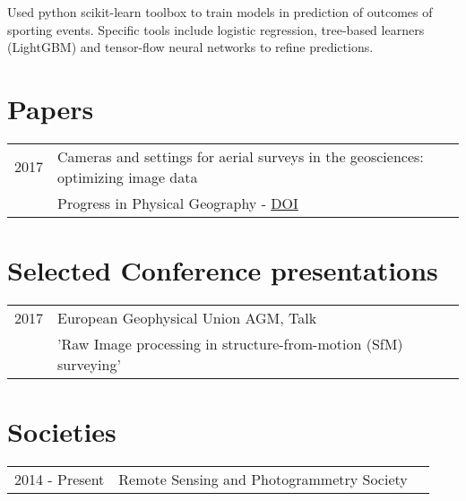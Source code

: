 \documentclass[]{JOC_CV}
\begin{document}
\begin{minipage}[t]{0.66\textwidth}
\linebreak
{}
Used python scikit-learn toolbox to train models in prediction of outcomes of sporting events.
Specific tools include logistic regression, tree-based learners (LightGBM) and tensor-flow neural
networks to refine predictions.
\sectionsep


\section{Papers}\label{sec:papers}

\begin{tabular}{rll}
2017	& Cameras and settings for aerial surveys in the geosciences: optimizing image data \\
&Progress in Physical Geography - \href{https://dx.doi.org/10.1177/0309133317703092}{DOI}
 \\
\end{tabular}
\sectionsep

\section{Selected Conference presentations}\label{sec:selected-conference-presentations}
\begin{tabular}{rll}
2017	     & European Geophysical Union AGM, Talk\\
&'Raw Image processing in structure-from-motion (SfM) surveying'\\
\end{tabular}
\sectionsep


\section{Societies}\label{sec:societies}

\begin{tabular}{rll}
2014 - Present	& Remote Sensing and Photogrammetry Society\\
\end{tabular}
\sectionsep

\end{minipage}
\end{document}
